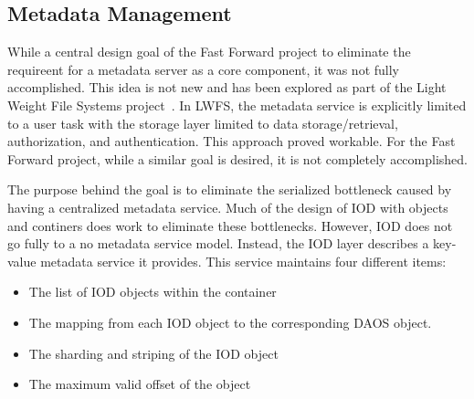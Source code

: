 \documentclass[conference]{sig-alt-gov2}
\begin{document}
\subsection{Metadata Management}
While a central design goal of the Fast Forward project to eliminate the
requireent for a metadata server as a core component, it was not fully
accomplished.  This idea is not new and has been explored as part of the Light
Weight File Systems project~\cite{oldfield:lwfs}. In LWFS, the metadata service
is explicitly limited to a user task with the storage layer limited to data
storage/retrieval, authorization, and authentication. This approach proved
workable. For the Fast Forward project, while a similar goal is desired, it is
not completely accomplished.

The purpose behind the goal is to eliminate the serialized bottleneck caused by
having a centralized metadata service. Much of the design of IOD with objects
and continers does work to eliminate these bottlenecks.  However, IOD does not
go fully to a no metadata service model. Instead, the IOD layer describes a
key-value metadata service it provides. This service maintains four different
items:

\begin{itemize}
\item The list of IOD objects within the container
\item The mapping from each IOD object to the corresponding DAOS object.
\item The sharding and striping of the IOD object
\item The maximum valid offset of the object
\end{itemize}
\end{document}
